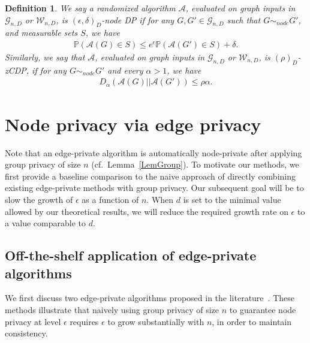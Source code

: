\documentclass{article}
\newtheorem{definition}{Definition}
\begin{document}
\begin{definition}
We say a randomized algorithm $\mathcal{A}$, evaluated on graph inputs in $\mathcal{G}_{n, D}$ or $\mathcal{W}_{n, D}$, is $(\epsilon, \delta)_D$-node DP if for any $G, G' \in \mathcal{G}_{n,D}$ such that $G \sim_{node} G'$, and measurable sets $S$, we have
\begin{align*}
\mathbb{P}(\mathcal{A}(G) \in S) \leq e^{\epsilon}\mathbb{P}(\mathcal{A}(G') \in S) + \delta.
\end{align*}
Similarly, we say that $\mathcal{A}$, evaluated on graph inputs in $\mathcal{G}_{n, D}$ or $\mathcal{W}_{n, D}$, is $(\rho)_D$-zCDP, if for any $G \sim_{node} G'$ and every $\alpha > 1$, we have
\begin{align*}
D_\alpha\left(\mathcal{A}(G)||\mathcal{A}(G')\right) \leq \rho\alpha.
\end{align*}
\end{definition}


\section{Node privacy via edge privacy}
\label{SecEdge}

Note that an edge-private algorithm is automatically node-private after applying group privacy of size $n$ (cf.\ Lemma~\ref{LemGroup}). To motivate our methods, we first provide a baseline comparison to the naive approach of directly combining existing edge-private methods with group privacy. Our subsequent goal will be to slow the growth of $\epsilon$ as a function of $n$. When $d$ is set to the minimal value allowed by our theoretical results, we will reduce the required growth rate on $\epsilon$ to a value comparable to $d$.

\subsection{Off-the-shelf application of edge-private algorithms}

We first discuss two edge-private algorithms proposed in the literature~\cite{HehEtal22, CheEtal23}. These methods illustrate that naively using group privacy of size $n$ to guarantee node privacy at level $\epsilon$ requires $\epsilon$ to grow substantially with $n$, in order to maintain consistency.

\end{document}
